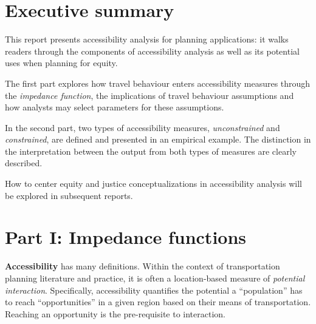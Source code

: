 \documentclass[12pt, oneside]{report}
\begin{document}



\setcounter{tocdepth}{1}
\tableofcontents
\restoregeometry

\newpage\ifdefined\Shaded\renewenvironment{Shaded}{\begin{tcolorbox}[boxrule=0pt, borderline west={3pt}{0pt}{shadecolor}, sharp corners, interior hidden, frame hidden, enhanced, breakable]}{\end{tcolorbox}}\fi

\hypertarget{executive-summary}{%
\section{Executive summary}\label{executive-summary}}

This report presents accessibility analysis for planning applications:
it walks readers through the components of accessibility analysis as
well as its potential uses when planning for equity.

The first part explores how travel behaviour enters accessibility
measures through the \emph{impedance function}, the implications of
travel behaviour assumptions and how analysts may select parameters for
these assumptions.

In the second part, two types of accessibility measures,
\emph{unconstrained} and \emph{constrained}, are defined and presented
in an empirical example. The distinction in the interpretation between
the output from both types of measures are clearly described.

How to center equity and justice conceptualizations in accessibility
analysis will be explored in subsequent reports.

\newpage

\hypertarget{sec-partI}{%
\section{Part I: Impedance functions}\label{sec-partI}}

\textbf{Accessibility} has many definitions. Within the context of
transportation planning literature and practice, it is often a
location-based measure of \emph{potential interaction}. Specifically,
accessibility quantifies the potential a ``population'' has to reach
``opportunities'' in a given region based on their means of
transportation. Reaching an opportunity is the pre-requisite to
interaction.
\end{document}
